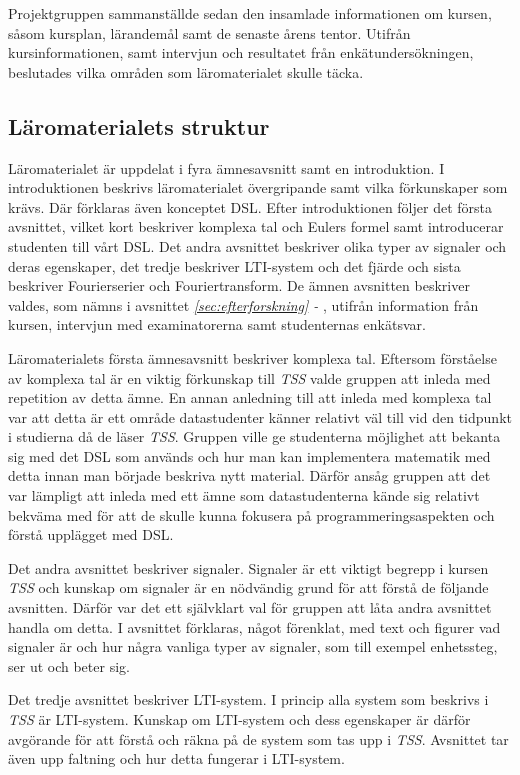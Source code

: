 \documentclass[12pt,a4paper,twoside,openright]{article}
\begin{document}
Projektgruppen sammanställde sedan den insamlade informationen om
kursen, såsom kursplan, lärandemål samt de senaste årens
tentor. Utifrån kursinformationen, samt intervjun och resultatet från
enkätundersökningen, beslutades vilka områden som läromaterialet
skulle täcka.

\subsection{Läromaterialets struktur}
\label{sec:struktur}
Läromaterialet är uppdelat i fyra ämnesavsnitt samt en introduktion. I
introduktionen beskrivs läromaterialet övergripande samt vilka
förkunskaper som krävs. Där förklaras även konceptet DSL. Efter
introduktionen följer det första avsnittet, vilket kort beskriver
komplexa tal och Eulers formel samt introducerar studenten till vårt
DSL. Det andra avsnittet beskriver olika typer av signaler och deras
egenskaper, det tredje beskriver LTI-system och det fjärde och sista
beskriver Fourierserier och Fouriertransform. De ämnen avsnitten
beskriver valdes, som nämns i avsnittet \textit{\ref{sec:efterforskning} - }, utifrån information från
kursen, intervjun med examinatorerna samt studenternas enkätsvar.

Läromaterialets första ämnesavsnitt beskriver komplexa tal. Eftersom
förståelse av komplexa tal är en viktig förkunskap till \textit{TSS}
valde gruppen att inleda med repetition av detta ämne. En annan
anledning till att inleda med komplexa tal var att detta är ett område
datastudenter känner relativt väl till vid den tidpunkt i studierna då
de läser \textit{TSS}. Gruppen ville ge studenterna möjlighet att
bekanta sig med det DSL som används och hur man kan implementera
matematik med detta innan man började beskriva nytt material. Därför
ansåg gruppen att det var lämpligt att inleda med ett ämne som
datastudenterna kände sig relativt bekväma med för att de skulle kunna
fokusera på programmeringsaspekten och förstå upplägget med DSL.

Det andra avsnittet beskriver signaler. Signaler är ett viktigt
begrepp i kursen \textit{TSS} och kunskap om signaler är en nödvändig
grund för att förstå de följande avsnitten. Därför var det ett
självklart val för gruppen att låta andra avsnittet handla om detta. I
avsnittet förklaras, något förenklat, med text och figurer vad
signaler är och hur några vanliga typer av signaler, som till exempel
enhetssteg, ser ut och beter sig.

Det tredje avsnittet beskriver LTI-system. I princip alla system som
beskrivs i \textit{TSS} är LTI-system. Kunskap om LTI-system och dess
egenskaper är därför avgörande för att förstå och räkna på de system
som tas upp i \textit{TSS}. Avsnittet tar även upp faltning och hur
detta fungerar i LTI-system.
\end{document}
